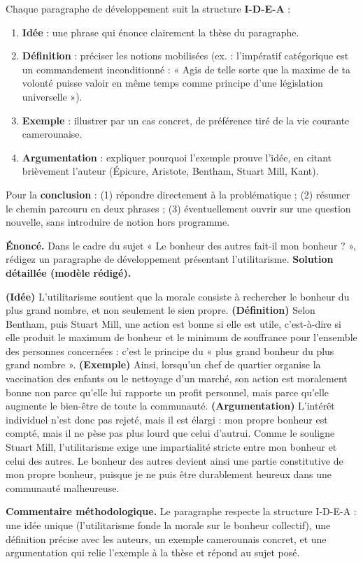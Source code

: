 \documentclass[11pt]{article}
\newcommand{\cle}[1]{{\popxbold\color{popdark}#1}}
\begin{document}
\begin{methode}
Chaque paragraphe de développement suit la structure \textbf{I-D-E-A} :
\begin{enumerate}
\item \textbf{Idée} : une phrase qui énonce clairement la thèse du paragraphe.
\item \textbf{Définition} : préciser les notions mobilisées (ex. : l'\cle{impératif catégorique} est un commandement inconditionné : « Agis de telle sorte que la maxime de ta volonté puisse valoir en même temps comme principe d'une législation universelle »).
\item \textbf{Exemple} : illustrer par un cas concret, de préférence tiré de la vie courante camerounaise.
\item \textbf{Argumentation} : expliquer pourquoi l'exemple prouve l'idée, en citant brièvement l'auteur (Épicure, Aristote, Bentham, Stuart Mill, Kant).
\end{enumerate}
Pour la \textbf{conclusion} : (1) répondre directement à la problématique ; (2) résumer le chemin parcouru en deux phrases ; (3) éventuellement ouvrir sur une question nouvelle, sans introduire de notion hors programme.
\end{methode}

\begin{exoresolu}
\textbf{Énoncé.} Dans le cadre du sujet « Le bonheur des autres fait-il mon bonheur ? », rédigez un paragraphe de développement présentant l'utilitarisme.
\tcblower
\textbf{Solution détaillée (modèle rédigé).}

\textbf{(Idée)} L'utilitarisme soutient que la morale consiste à rechercher le bonheur du plus grand nombre, et non seulement le sien propre. \textbf{(Définition)} Selon Bentham, puis Stuart Mill, une action est bonne si elle est \cle{utile}, c'est-à-dire si elle produit le maximum de bonheur et le minimum de souffrance pour l'ensemble des personnes concernées : c'est le principe du « plus grand bonheur du plus grand nombre ». \textbf{(Exemple)} Ainsi, lorsqu'un chef de quartier organise la vaccination des enfants ou le nettoyage d'un marché, son action est moralement bonne non parce qu'elle lui rapporte un profit personnel, mais parce qu'elle augmente le bien-être de toute la communauté. \textbf{(Argumentation)} L'intérêt individuel n'est donc pas rejeté, mais il est élargi : mon propre bonheur est compté, mais il ne pèse pas plus lourd que celui d'autrui. Comme le souligne Stuart Mill, l'utilitarisme exige une impartialité stricte entre mon bonheur et celui des autres. Le bonheur des autres devient ainsi une partie constitutive de mon propre bonheur, puisque je ne puis être durablement heureux dans une communauté malheureuse.

\textbf{Commentaire méthodologique.} Le paragraphe respecte la structure I-D-E-A : une idée unique (l'utilitarisme fonde la morale sur le bonheur collectif), une définition précise avec les auteurs, un exemple camerounais concret, et une argumentation qui relie l'exemple à la thèse et répond au sujet posé.
\end{exoresolu}
\end{document}
